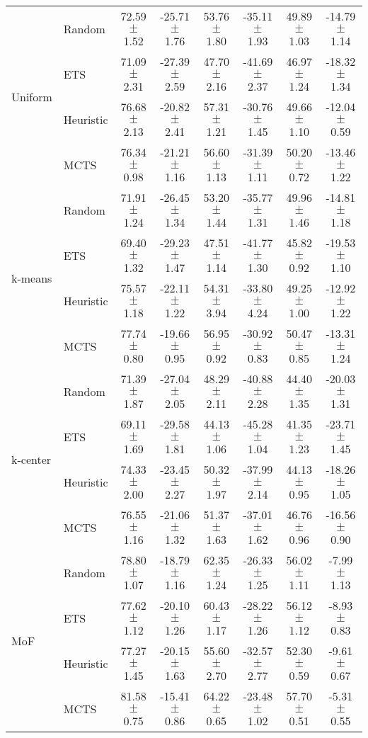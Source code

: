 \begin{tabular}{llcccccc}
	\multirow{4}{*}{Uniform}  & Random  & 72.59 $\pm$ 1.52  & -25.71 $\pm$ 1.76  & 53.76 $\pm$ 1.80   & -35.11 $\pm$ 1.93  & 49.89 $\pm$ 1.03    & -14.79 $\pm$ 1.14    \\
	& ETS     & 71.09 $\pm$ 2.31  & -27.39 $\pm$ 2.59  & 47.70 $\pm$ 2.16   & -41.69 $\pm$ 2.37  & 46.97 $\pm$ 1.24    & -18.32 $\pm$ 1.34    \\
	& Heuristic & 76.68 $\pm$ 2.13  & -20.82 $\pm$ 2.41  & 57.31 $\pm$ 1.21   & -30.76 $\pm$ 1.45  & 49.66 $\pm$ 1.10    & -12.04 $\pm$ 0.59    \\
	& MCTS    & 76.34 $\pm$ 0.98  & -21.21 $\pm$ 1.16  & 56.60 $\pm$ 1.13   & -31.39 $\pm$ 1.11  & 50.20 $\pm$ 0.72    & -13.46 $\pm$ 1.22    \\ \midrule 
	\multirow{4}{*}{k-means}  & Random  & 71.91 $\pm$ 1.24  & -26.45 $\pm$ 1.34  & 53.20 $\pm$ 1.44   & -35.77 $\pm$ 1.31  & 49.96 $\pm$ 1.46    & -14.81 $\pm$ 1.18    \\
	& ETS     & 69.40 $\pm$ 1.32  & -29.23 $\pm$ 1.47  & 47.51 $\pm$ 1.14   & -41.77 $\pm$ 1.30  & 45.82 $\pm$ 0.92    & -19.53 $\pm$ 1.10    \\
	& Heuristic & 75.57 $\pm$ 1.18  & -22.11 $\pm$ 1.22  & 54.31 $\pm$ 3.94   & -33.80 $\pm$ 4.24  & 49.25 $\pm$ 1.00    & -12.92 $\pm$ 1.22    \\
	& MCTS    & 77.74 $\pm$ 0.80  & -19.66 $\pm$ 0.95  & 56.95 $\pm$ 0.92   & -30.92 $\pm$ 0.83  & 50.47 $\pm$ 0.85    & -13.31 $\pm$ 1.24    \\ \midrule 
	\multirow{4}{*}{k-center} & Random  & 71.39 $\pm$ 1.87  & -27.04 $\pm$ 2.05  & 48.29 $\pm$ 2.11   & -40.88 $\pm$ 2.28  & 44.40 $\pm$ 1.35    & -20.03 $\pm$ 1.31    \\
	& ETS     & 69.11 $\pm$ 1.69  & -29.58 $\pm$ 1.81  & 44.13 $\pm$ 1.06   & -45.28 $\pm$ 1.04  & 41.35 $\pm$ 1.23    & -23.71 $\pm$ 1.45    \\
	& Heuristic & 74.33 $\pm$ 2.00  & -23.45 $\pm$ 2.27  & 50.32 $\pm$ 1.97   & -37.99 $\pm$ 2.14  & 44.13 $\pm$ 0.95    & -18.26 $\pm$ 1.05    \\
	& MCTS    & 76.55 $\pm$ 1.16  & -21.06 $\pm$ 1.32  & 51.37 $\pm$ 1.63   & -37.01 $\pm$ 1.62  & 46.76 $\pm$ 0.96    & -16.56 $\pm$ 0.90    \\ \midrule 
	\multirow{4}{*}{MoF}      & Random  & 78.80 $\pm$ 1.07  & -18.79 $\pm$ 1.16  & 62.35 $\pm$ 1.24   & -26.33 $\pm$ 1.25  & 56.02 $\pm$ 1.11    & -7.99 $\pm$ 1.13     \\
	& ETS     & 77.62 $\pm$ 1.12  & -20.10 $\pm$ 1.26  & 60.43 $\pm$ 1.17   & -28.22 $\pm$ 1.26  & 56.12 $\pm$ 1.12    & -8.93 $\pm$ 0.83     \\
	& Heuristic & 77.27 $\pm$ 1.45  & -20.15 $\pm$ 1.63  & 55.60 $\pm$ 2.70   & -32.57 $\pm$ 2.77  & 52.30 $\pm$ 0.59    & -9.61 $\pm$ 0.67     \\
	& MCTS    & 81.58 $\pm$ 0.75  & -15.41 $\pm$ 0.86  & 64.22 $\pm$ 0.65   & -23.48 $\pm$ 1.02  & 57.70 $\pm$ 0.51    & -5.31 $\pm$ 0.55    \\
	\bottomrule
\end{tabular}